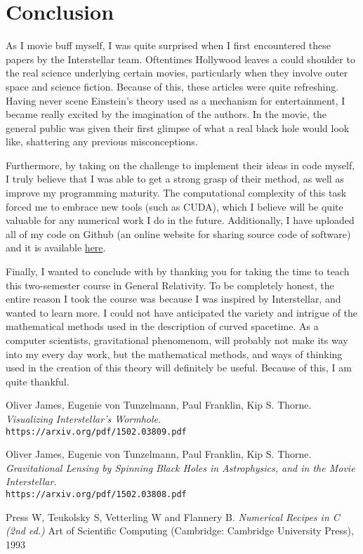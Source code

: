 \documentclass{article}
\begin{document}
\section{Conclusion}
 \par As I movie buff myself, I was quite surprised when I first encountered these papers by the Interstellar team. Oftentimes Hollywood leaves a could shoulder to the real science underlying certain movies, particularly when they involve outer space and science fiction. Because of this, these articles were quite refreshing. Having never scene Einstein's theory used as a mechanism for entertainment, I became really excited by the imagination of the authors. In the movie, the general public was given their first glimpse of what a real black hole would look like, shattering any previous misconceptions. \par
	Furthermore, by taking on the challenge to implement their ideas in code myself, I truly believe that I was able to get a strong grasp of their method, as well as improve my programming maturity. The computational complexity of this task forced me to embrace new tools (such as CUDA), which I believe will be quite valuable for any numerical work I do in the future. Additionally, I have uploaded all of my code on Github (an online website for sharing source code of software) and it is available \color{red}\href{https://github.com/Varcho/GeneralRelativity}{here}\color{black}.\par
	Finally, I wanted to conclude with by thanking you for taking the time to teach this two-semester course in General Relativity. To be completely honest, the entire reason I took the course was because I was inspired by Interstellar, and wanted to learn more. I could not have anticipated the variety and intrigue of the mathematical methods used in the description of curved spacetime. As a computer scientists, gravitational phenomenom, will probably not make its way into my every day work, but the mathematical methods, and ways of thinking used in the creation of this theory will definitely be useful. Because of this, I am quite thankful.
	


\begin{thebibliography}{9}
Oliver James, Eugenie von Tunzelmann, Paul Franklin, Kip S. Thorne. 
\textit{Visualizing Interstellar's Wormhole}. 
\\\texttt{https://arxiv.org/pdf/1502.03809.pdf}
 
Oliver James, Eugenie von Tunzelmann, Paul Franklin, Kip S. Thorne. 
\textit{Gravitational Lensing by Spinning Black Holes in Astrophysics, and in the Movie Interstellar}. 
\\\texttt{https://arxiv.org/pdf/1502.03808.pdf}
 
 
Press W, Teukolsky S, Vetterling W and Flannery B.
\textit{Numerical Recipes in C (2nd ed.)}
Art of Scientific Computing (Cambridge: Cambridge University Press), 1993
\end{thebibliography}
\end{document}
